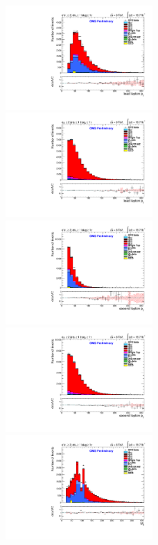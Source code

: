 \documentclass[oneside, a4paper, 11pt, ]{report}
\begin{document}
\begin{figure}
\includegraphics[width=0.5\textwidth]{Plots/ControlPlots/TTbarDiLeptonAnalysis/EE/DiLepton/LeadLepton_Pt_splitTTbar_ratio.pdf}
\includegraphics[width=0.5\textwidth]{Plots/ControlPlots/TTbarDiLeptonAnalysis/EMu/DiLepton/LeadLepton_Pt_splitTTbar_ratio.pdf}\\
\includegraphics[width=0.5\textwidth]{Plots/ControlPlots/TTbarDiLeptonAnalysis/EE/DiLepton/SecondLepton_Pt_splitTTbar_ratio.pdf}
\includegraphics[width=0.5\textwidth]{Plots/ControlPlots/TTbarDiLeptonAnalysis/EMu/DiLepton/SecondLepton_Pt_splitTTbar_ratio.pdf}\\
\includegraphics[width=0.5\textwidth]{Plots/ControlPlots/TTbarDiLeptonAnalysis/EE/DiLepton/diLepton_Mass_splitTTbar_ratio.pdf}

\end{figure}
\end{document}

